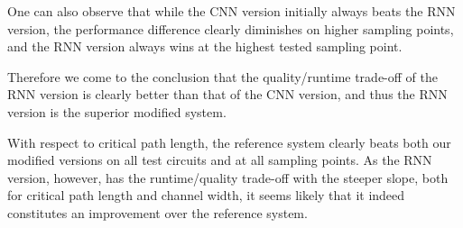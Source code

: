 One can also observe that while the \gls{CNN} version initially always beats the \gls{RNN} version, the performance difference clearly diminishes on higher sampling points, and the \gls{RNN} version always wins at the highest tested sampling point.

Therefore we come to the conclusion that the quality/runtime trade-off of the \gls{RNN} version is clearly better than that of the \gls{CNN} version, and thus the \gls{RNN} version is the superior modified system.

With respect to critical path length, the reference system clearly beats both our modified versions on all test circuits and at all sampling points. As the \gls{RNN} version, however, has the runtime/quality trade-off with the steeper slope, both for critical path length and channel width, it seems likely that it indeed constitutes an improvement over the reference system.

